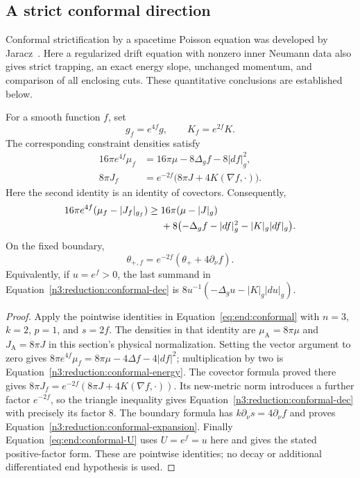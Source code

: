 \subsection{A strict conformal direction}

Conformal strictification by a spacetime Poisson equation was developed
by Jaracz~\cite{Jaracz2025StrictDEC}. Here a regularized drift equation
with nonzero inner Neumann data also gives strict trapping, an exact
energy slope, unchanged momentum, and comparison of all enclosing cuts.
These quantitative conclusions are established below.

\begin{lemma}
\label{n3:reduction:conformal-formulas}
For a smooth function $f$, set
\[
 g_f=e^{4f}g,\qquad K_f=e^{2f}K.
\]
The corresponding constraint densities satisfy
\begin{align}
 16\pi e^{4f}\mu_f
   &=16\pi\mu-8\Delta_g f-8|df|_g^2,
       \label{n3:reduction:conformal-energy}\\
 8\pi J_f
   &=e^{-2f}\bigl(8\pi J+4K(\nabla f,\cdot)\bigr).
       \label{n3:reduction:conformal-momentum}
\end{align}
Here the second identity is an identity of covectors.  Consequently,
\begin{align}
 16\pi e^{4f}(\mu_f-|J_f|_{g_f})
 \ge{}&16\pi(\mu-|J|_g)\notag\\
 &+8\bigl(-\Delta_g f-|df|_g^2-|K|_g|df|_g\bigr).
       \label{n3:reduction:conformal-dec}
\end{align}
On the fixed boundary,
\begin{equation}
 \theta_{+,f}=e^{-2f}(\theta_++4\partial_\nu f).
       \label{n3:reduction:conformal-expansion}
\end{equation}
Equivalently, if $u=e^f>0$, the last summand in
Equation~\eqref{n3:reduction:conformal-dec} is
$8u^{-1}(-\Delta_g u-|K|_g|du|_g)$.
\end{lemma}

\begin{proof}
Apply the pointwise identities in Equation~\eqref{eq:end:conformal}
with $n=3$, $k=2$, $p=1$, and $s=2f$. The densities in that identity
are $\mu_{\mathrm A}=8\pi\mu$ and $J_{\mathrm A}=8\pi J$ in this
section's physical normalization. Setting the vector argument to zero
gives $8\pi e^{4f}\mu_f=8\pi\mu-4\Delta f-4|df|^2$;
multiplication by two is
Equation~\eqref{n3:reduction:conformal-energy}. The covector formula
proved there gives
$8\pi J_f=e^{-2f}(8\pi J+4K(\nabla f,\cdot))$.
Its new-metric norm introduces a further factor $e^{-2f}$, so the
triangle inequality gives Equation~\eqref{n3:reduction:conformal-dec}
with precisely its factor $8$. The boundary formula has
$k\partial_\nu s=4\partial_\nu f$ and proves
Equation~\eqref{n3:reduction:conformal-expansion}. Finally
Equation~\eqref{eq:end:conformal-U} uses $U=e^f=u$ here and gives
the stated positive-factor form. These are pointwise identities;
no decay or additional differentiated end hypothesis is used.
\end{proof}

